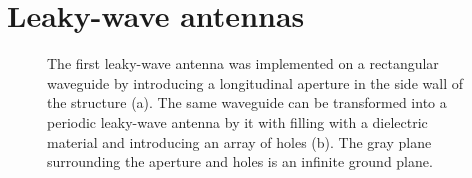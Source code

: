 
\section{Leaky-wave antennas} \label{chap0:LWA}
\begin{figure} [t]
\centering
  \noindent
\hspace*{\fill}%
	\noindent
	\mbox{}
\hspace*{\fill}%
  \mbox{}
	  \hspace*{\fill}%
  \caption[Diagrams of a uniform and a periodic leaky wave antenna implemented on rectangular waveguides.]{The first leaky-wave antenna was implemented on a rectangular waveguide by introducing a longitudinal aperture in the side wall of the structure (a). The same waveguide can be transformed into a periodic leaky-wave antenna by it with filling with a dielectric material and introducing an array of holes (b). The gray plane surrounding the aperture and holes is an infinite ground plane. }
\label{fig:LWAStructure}
\end{figure}

